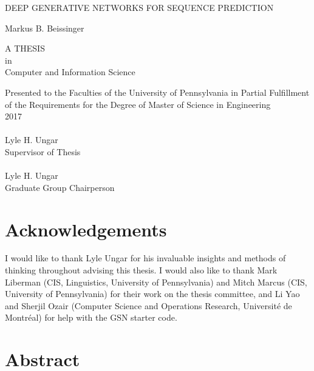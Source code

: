 \documentclass[12pt, titlepage]{report}
\begin{document}
	\doublespacing
	
	\begin{titlepage}
		\begin{center}
			{\singlespacing \LARGE \uppercase{Deep Generative Networks for Sequence Prediction}\\[24pt]}
			
			{\Large Markus B. Beissinger\\[12pt]}
			
			\uppercase{a thesis}\\[12pt]					
			in\\			
			{\Large Computer and Information Science\\[36pt]}
			
			Presented to the Faculties of the University of Pennsylvania in Partial Fulfillment of the Requirements for the Degree of Master of Science in Engineering\\[12pt]
			
			2017\\[60pt]
			
			\singlespacing
			\makebox[2.5in]{\hrulefill}\\
			Lyle H. Ungar\\
			Supervisor of Thesis\\[48pt]
			
			\makebox[2.5in]{\hrulefill}\\
			Lyle H. Ungar\\
			Graduate Group Chairperson
			
			\doublespacing
		\end{center}
	\end{titlepage}
	

	\chapter*{Acknowledgements}
	I would like to thank Lyle Ungar for his invaluable insights and methods of thinking throughout advising this thesis. I would also like to thank Mark Liberman (CIS, Linguistics, University of Pennsylvania) and Mitch Marcus (CIS, University of Pennsylvania) for their work on the thesis committee, and Li Yao and Sherjil Ozair (Computer Science and Operations Research, Universit\'{e} de Montr\'{e}al) for help with the GSN starter code.
	
	\chapter*{Abstract}
	
	
\end{document}

